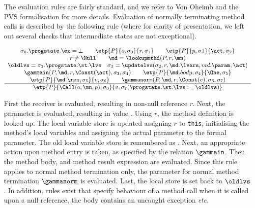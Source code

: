 The evaluation rules are fairly standard, and we refer to Von Oheimb
and the PVS formalisation for more details.  Evaluation
of normally terminating method calls is described by the following rule
(where for
clarity of presentation, we left out several checks that intermediate
states are not exceptional).

\vspace*{-1em}
\[{\small
\begin{array}{c}
\sigma_0.\progstate.\ex = \bot \qquad        %
\etp{P}{o, \sigma_0}{r,\sigma_1} \qquad      %
\etp{P}{p, \sigma1}{\act, \sigma_2}\\        %
r \not= \Null \qquad                         %
\md = \lookupmthd(P, r, \mn) \\
\oldlvs = \sigma_2.\progstate.\st.\lvs \quad
\sigma_3 = \updatelvs(\sigma_2, r, \md.\lvars, md.\param, \act) \\
\gammain(P, \md, r, \Const(\act), \sigma_3, \sigma_4) \qquad
\etp{P}{\md.body, \sigma_4}{\One,\sigma_5} \\
\etp{P}{\md.\res, \sigma_5}{v,\sigma_6}\qquad
\gammanorm(P, \md, r, \Const(v), \sigma_6, \sigma_7)\\
\hline
\etp{P}{\Call(o,\mn,p), \sigma_0}{v, \sigma_7
(\progstate.\st.\lvs := \oldlvs)}
\end{array}}
\]

First the receiver is evaluated, resulting in non-null reference
\(r\).  Next, the parameter is evaluated, resulting in value
\act. Using \(r\), the method definition
\md is looked up.  The local variable store is updated assigning
\(r\) to \texttt{this}, initialising the method's local variables and
assigning the actual parameter to the formal parameter. The old local
variable store is remembered as \oldlvs.  Next, an appropriate action
upon method entry is taken, as specified by the relation
\(\gammain\). Then the method body, and method result expression are
evaluated. Since this rule applies to normal method termination only,
the parameter for normal method termination \(\gammanorm\) is
evaluated.  Last, the local store is set back to \(\oldlvs\). In
addition, rules exist that specify behaviour of a method call when it
is called upon a null reference, the body contains an uncaught
exception \emph{etc.}


